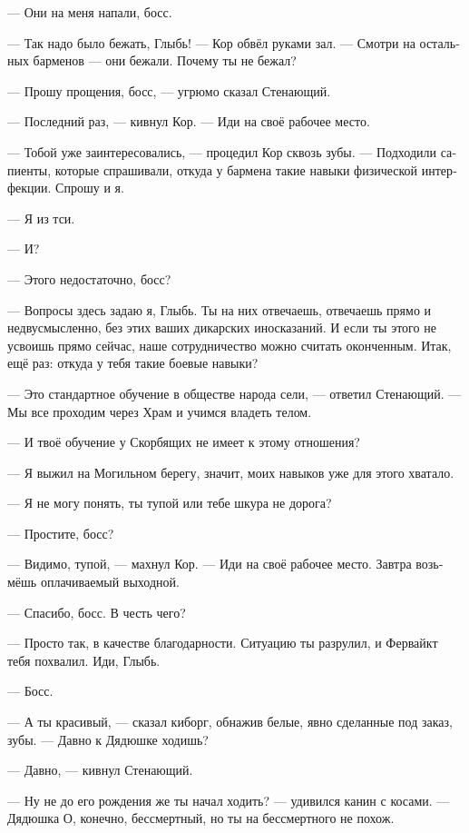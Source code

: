 \documentclass[a4paper,12pt,fleqn]{book}\usepackage{cooltooltips}\usepackage{polyglossia}\setdefaultlanguage[babelshorthands=true]{russian}\setotherlanguage{english}\defaultfontfeatures{Ligatures=TeX,Mapping=tex-text} \usepackage{xcolor}\definecolor{lightgray}{HTML}{bbbbbb}\color{lightgray}\newcommand{\ml}[3]{\textenglish{\textcolor{black}{#3}}}
\newcommand{\asterism}{\vspace{1em}{\centering\Large\bfseries$\ast~\ast~\ast$\par}\vspace{1em}}
\begin{document}
--- Они на меня напали, босс.

--- Так надо было бежать, Глыбь! --- Кор обвёл руками зал.
--- Смотри на остальных барменов --- они бежали.
Почему ты не бежал?

--- Прошу прощения, босс, --- угрюмо сказал Стенающий.

--- Последний раз, --- кивнул Кор.
--- Иди на своё рабочее место.

\asterism

--- Тобой уже заинтересовались, --- процедил Кор сквозь зубы.
--- Подходили сапиенты, которые спрашивали, откуда у бармена такие навыки физической интерфекции.
Спрошу и я.

--- Я из тси.

--- И?

--- Этого недостаточно, босс?

--- Вопросы здесь задаю я, Глыбь.
Ты на них отвечаешь, отвечаешь прямо и недвусмысленно, без этих ваших дикарских иносказаний.
И если ты этого не усвоишь прямо сейчас, наше сотрудничество можно считать оконченным.
Итак, ещё раз: откуда у тебя такие боевые навыки?

--- Это стандартное обучение в обществе народа сели, --- ответил Стенающий.
--- Мы все проходим через Храм и учимся владеть телом.

--- И твоё обучение у Скорбящих не имеет к этому отношения?

--- Я выжил на Могильном берегу, значит, моих навыков уже для этого хватало.

--- Я не могу понять, ты тупой или тебе шкура не дорога?

--- Простите, босс?

--- Видимо, тупой, --- махнул Кор.
--- Иди на своё рабочее место.
Завтра возьмёшь оплачиваемый выходной.

--- Спасибо, босс.
В честь чего?

--- Просто так, в качестве благодарности.
Ситуацию ты разрулил, и Фервайкт тебя похвалил.
Иди, Глыбь.

--- Босс.

\asterism

--- А ты красивый, --- сказал киборг, обнажив белые, явно сделанные под заказ, зубы.
--- Давно к Дядюшке ходишь?

--- Давно, --- кивнул Стенающий.

--- Ну не до его рождения же ты начал ходить? --- удивился канин с косами.
--- Дядюшка О, конечно, бессмертный, но ты на бессмертного не похож.
\end{document}
